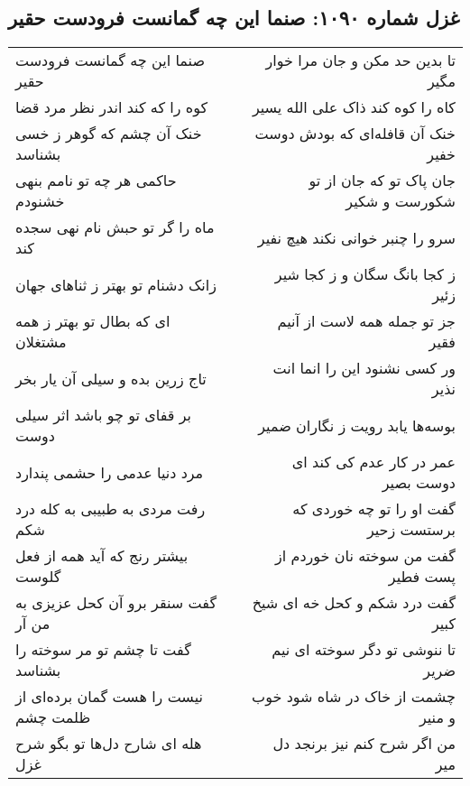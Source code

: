 \begin{center}
\section*{غزل شماره ۱۰۹۰: صنما این چه گمانست فرودست حقیر}
\label{sec:1090}
\begin{longtable}{l p{0.5cm} r}
صنما این چه گمانست فرودست حقیر
&&
تا بدین حد مکن و جان مرا خوار مگیر
\\
کوه را که کند اندر نظر مرد قضا
&&
کاه را کوه کند ذاک علی الله یسیر
\\
خنک آن چشم که گوهر ز خسی بشناسد
&&
خنک آن قافله‌ای که بودش دوست خفیر
\\
حاکمی هر چه تو نامم بنهی خشنودم
&&
جان پاک تو که جان از تو شکورست و شکیر
\\
ماه را گر تو حبش نام نهی سجده کند
&&
سرو را چنبر خوانی نکند هیچ نفیر
\\
زانک دشنام تو بهتر ز ثناهای جهان
&&
ز کجا بانگ سگان و ز کجا شیر زئیر
\\
ای که بطال تو بهتر ز همه مشتغلان
&&
جز تو جمله همه لاست از آنیم فقیر
\\
تاج زرین بده و سیلی آن یار بخر
&&
ور کسی نشنود این را انما انت نذیر
\\
بر قفای تو چو باشد اثر سیلی دوست
&&
بوسه‌ها یابد رویت ز نگاران ضمیر
\\
مرد دنیا عدمی را حشمی پندارد
&&
عمر در کار عدم کی کند ای دوست بصیر
\\
رفت مردی به طبیبی به کله درد شکم
&&
گفت او را تو چه خوردی که برستست زحیر
\\
بیشتر رنج که آید همه از فعل گلوست
&&
گفت من سوخته نان خوردم از پست فطیر
\\
گفت سنقر برو آن کحل عزیزی به من آر
&&
گفت درد شکم و کحل خه ای شیخ کبیر
\\
گفت تا چشم تو مر سوخته را بشناسد
&&
تا ننوشی تو دگر سوخته ای نیم ضریر
\\
نیست را هست گمان برده‌ای از ظلمت چشم
&&
چشمت از خاک در شاه شود خوب و منیر
\\
هله ای شارح دل‌ها تو بگو شرح غزل
&&
من اگر شرح کنم نیز برنجد دل میر
\\
\end{longtable}
\end{center}
